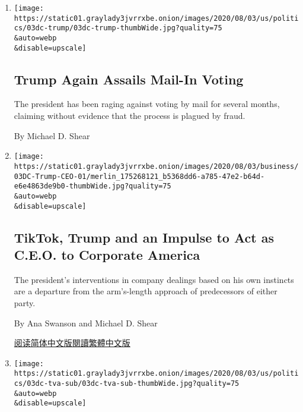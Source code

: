 \begin{enumerate}
\def\labelenumi{\arabic{enumi}.}
\item
  \href{/2020/08/03/us/politics/trump-mail-in-voting.html}{}

  \texttt{[image: https://static01.graylady3jvrrxbe.onion/images/2020/08/03/us/politics/03dc-trump/03dc-trump-thumbWide.jpg?quality=75\\\&auto=webp\\\&disable=upscale]}

  \hypertarget{trump-again-assails-mail-in-voting}{%
  \subsection{Trump Again Assails Mail-In
  Voting}\label{trump-again-assails-mail-in-voting}}

  The president has been raging against voting by mail for several
  months, claiming without evidence that the process is plagued by
  fraud.

  By Michael D. Shear
\item
  \href{/2020/08/03/business/economy/trump-tiktok-china-business.html}{}

  \texttt{[image: https://static01.graylady3jvrrxbe.onion/images/2020/08/03/business/03DC-Trump-CEO-01/merlin\_175268121\_b5368dd6-a785-47e2-b64d-e6e4863de9b0-thumbWide.jpg?quality=75\\\&auto=webp\\\&disable=upscale]}

  \hypertarget{tiktok-trump-and-an-impulse-to-act-as-ceo-to-corporate-america}{%
  \subsection{TikTok, Trump and an Impulse to Act as C.E.O. to Corporate
  America}\label{tiktok-trump-and-an-impulse-to-act-as-ceo-to-corporate-america}}

  The president's interventions in company dealings based on his own
  instincts are a departure from the arm's-length approach of
  predecessors of either party.

  By Ana Swanson and Michael D. Shear

  \href{https://cn.nytimes3xbfgragh.onion/business/20200804/trump-tiktok-china-business/}{阅读简体中文版}\href{https://cn.nytimes3xbfgragh.onion/business/20200804/trump-tiktok-china-business/zh-hant/}{閱讀繁體中文版}
\item
  \href{/2020/08/03/us/politics/trump-tennessee-valley-authority.html}{}

  \texttt{[image: https://static01.graylady3jvrrxbe.onion/images/2020/08/03/us/politics/03dc-tva-sub/03dc-tva-sub-thumbWide.jpg?quality=75\\\&auto=webp\\\&disable=upscale]}


\end{enumerate}
